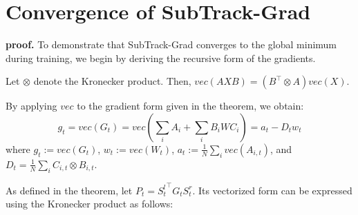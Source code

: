 \section{Convergence of SubTrack-Grad}
\label{appendix:C}

\convergence*

{\bf proof.} To demonstrate that SubTrack-Grad converges to the global minimum during training, we begin by deriving the recursive form of the gradients.

Let \(\otimes\) denote the Kronecker product. Then, \( vec(AXB) = (B^\top \otimes A) vec(X)\). 

By applying \(vec\) to the gradient form given in the theorem, we obtain:
\begin{equation}
\label{eq:11}
    g_t = vec(G_t) = vec(\sum_i A_i + \sum_i B_iWC_i) = a_t - D_t w_t 
\end{equation}
where \(g_t := vec(G_t)\), \(w_t := vec(W_t)\), \(a_t := \frac1N\sum_i vec(A_{i,t})\), and \(D_t = \frac1N\sum_i C_{i,t} \otimes B_{i,t}\).

As defined in the theorem, let \(P_t = {S_t^l}^\top G_t S_t^r\). Its vectorized form can be expressed using the Kronecker product as follows:

